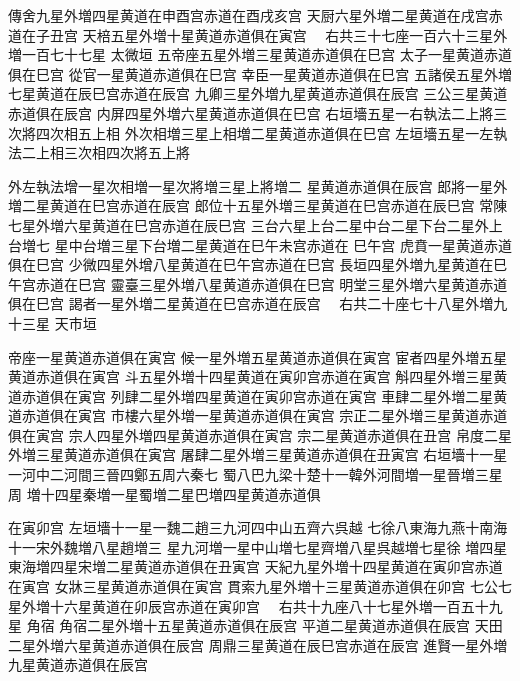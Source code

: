 \begin{正文}
傳舍九星外増四星黄道在申酉宫赤道在酉戌亥宫
天厨六星外増二星黄道在戌宫赤道在子丑宫
天棓五星外増十星黄道赤道俱在寅宫
　右共三十七座一百六十三星外増一百七十七星
太微垣
五帝座五星外増三星黄道赤道俱在巳宫
太子一星黄道赤道俱在巳宫
從官一星黄道赤道俱在巳宫
幸臣一星黄道赤道俱在巳宫
五諸侯五星外増七星黄道在辰巳宫赤道在辰宫
九卿三星外増九星黄道赤道俱在辰宫
三公三星黄道赤道俱在辰宫
内屏四星外増六星黄道赤道俱在巳宫
右垣墻五星一右執法二上將三次將四次相五上相
外次相増三星上相増二星黄道赤道俱在巳宫
左垣墻五星一左執法二上相三次相四次將五上將
\par
外左執法增一星次相増一星次將増三星上將増二
星黄道赤道俱在辰宫
郎將一星外増二星黄道在巳宫赤道在辰宫
郎位十五星外増三星黄道在巳宫赤道在辰巳宫
常陳七星外増六星黄道在巳宫赤道在辰巳宫
三台六星上台二星中台二星下台二星外上台増七
星中台増三星下台増二星黄道在巳午未宫赤道在
巳午宫
虎賁一星黄道赤道俱在巳宫
少微四星外增八星黄道在巳午宫赤道在巳宫
長垣四星外増九星黄道在巳午宫赤道在巳宫
靈臺三星外増八星黄道赤道俱在巳宫
明堂三星外増六星黄道赤道俱在巳宫
謁者一星外増二星黄道在巳宫赤道在辰宫
　右共二十座七十八星外増九十三星
天市垣
\par
帝座一星黄道赤道俱在寅宫
候一星外増五星黄道赤道俱在寅宫
宦者四星外増五星黄道赤道俱在寅宫
斗五星外増十四星黄道在寅卯宫赤道在寅宫
斛四星外増三星黄道赤道俱在寅宫
列肆二星外増四星黄道在寅卯宫赤道在寅宫
車肆二星外増二星黄道赤道俱在寅宫
市樓六星外増一星黄道赤道俱在寅宫
宗正二星外増三星黄道赤道俱在寅宫
宗人四星外増四星黄道赤道俱在寅宫
宗二星黄道赤道俱在丑宫
帛度二星外増三星黄道赤道俱在寅宫
屠肆二星外増三星黄道赤道俱在丑寅宫
右垣墻十一星一河中二河間三晉四鄭五周六秦七
蜀八巴九梁十楚十一韓外河間増一星晉増三星周
増十四星秦増一星蜀増二星巴増四星黄道赤道俱
\par
在寅卯宫
左垣墻十一星一魏二趙三九河四中山五齊六呉越
七徐八東海九燕十南海十一宋外魏増八星趙増三
星九河増一星中山増七星齊増八星呉越増七星徐
増四星東海増四星宋増二星黄道赤道俱在丑寅宫
天紀九星外増十四星黄道在寅卯宫赤道在寅宫
女牀三星黄道赤道俱在寅宫
貫索九星外増十三星黄道赤道俱在卯宫
七公七星外増十六星黄道在卯辰宫赤道在寅卯宫
　右共十九座八十七星外増一百五十九星
角宿
角宿二星外増十五星黄道赤道俱在辰宫
平道二星黄道赤道俱在辰宫
天田二星外増六星黄道赤道俱在辰宫
周鼎三星黄道在辰巳宫赤道在辰宫
進賢一星外増九星黄道赤道俱在辰宫

\end{正文}
